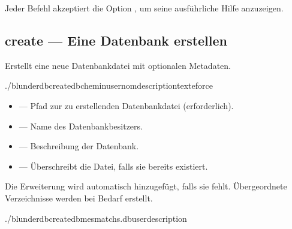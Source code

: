\documentclass[letterpaper,10pt,german]{sphinxmanual}
\begin{document}
\sphinxAtStartPar
Jeder Befehl akzeptiert die Option , um seine ausführliche Hilfe anzuzeigen.


\subsection{create — Eine Datenbank erstellen}
\label{\detokenize{cli:create-creer-une-base-de-donnees}}
\sphinxAtStartPar
Erstellt eine neue Datenbankdatei mit optionalen Metadaten.

\begin{sphinxVerbatim}[commandchars=\\\{\}]
./blunderdbcreate\PYGZhy{}\PYGZhy{}db\PYGZlt{}chemin\PYGZgt{}\PYG{o}{[}\PYGZhy{}\PYGZhy{}user\PYGZlt{}nom\PYGZgt{}\PYG{o}{]}\PYG{o}{[}\PYGZhy{}\PYGZhy{}description\PYGZlt{}texte\PYGZgt{}\PYG{o}{]}\PYG{o}{[}\PYGZhy{}\PYGZhy{}force\PYG{o}{]}
\end{sphinxVerbatim}

\sphinxAtStartPar
{}
\begin{itemize}
\item {} 
\sphinxAtStartPar
{} — Pfad zur zu erstellenden Datenbankdatei (erforderlich).

\item {} 
\sphinxAtStartPar
{} — Name des Datenbankbesitzers.

\item {} 
\sphinxAtStartPar
{} — Beschreibung der Datenbank.

\item {} 
\sphinxAtStartPar
{} — Überschreibt die Datei, falls sie bereits existiert.

\end{itemize}

\sphinxAtStartPar
Die Erweiterung  wird automatisch hinzugefügt, falls sie fehlt. Übergeordnete Verzeichnisse werden bei Bedarf erstellt.

\sphinxAtStartPar
{}

\begin{sphinxVerbatim}[commandchars=\\\{\}]
./blunderdbcreate\PYGZhy{}\PYGZhy{}dbmes\PYGZus{}matchs.db\PYGZhy{}\PYGZhy{}user\PYGZhy{}\PYGZhy{}description
\end{sphinxVerbatim}
\end{document}
